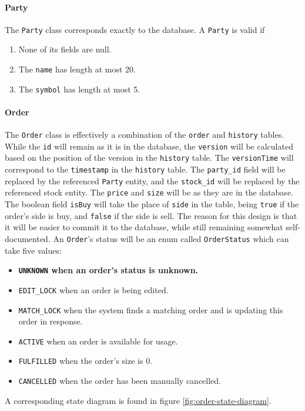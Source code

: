 \documentclass{article}
\begin{document}
 
\paragraph{Party} The \texttt{Party} class corresponds exactly to the database. A \texttt{Party} is valid if 
\begin{enumerate}
    \item None of its fields are null.
    \item The \texttt{name} has length at most 20.
    \item The \texttt{symbol} has length at most 5.
\end{enumerate}


\paragraph{Order} The \texttt{Order} class is effectively a combination of the \texttt{order} and \texttt{history} tables. While the \texttt{id} will remain as it is in the database, the \texttt{version} will be calculated based on the position of the version in the \texttt{history} table. The \texttt{versionTime} will correspond to the \texttt{timestamp} in the \texttt{history} table. The \texttt{party\_id} field will be replaced by the referenced \texttt{Party} entity, and the \texttt{stock\_id} will be replaced by the referenced stock entity. The \texttt{price} and \texttt{size} will be as they are in the database. The boolean field \texttt{isBuy} will take the place of \texttt{side} in the table, being \texttt{true} if the order's side is buy, and \texttt{false} if the side is sell. The reason for this design is that it will be easier to commit it to the database, while still remaining somewhat self-documented. An \texttt{Order}'s status will be an enum called \texttt{OrderStatus} which can take five values:

\begin{itemize}
    \item \textbf{\texttt{UNKNOWN} when an order's status is unknown.}
    \item \texttt{EDIT\_LOCK} when an order is being edited.
    \item \texttt{MATCH\_LOCK} when the system finds a matching order and is updating this order in response.
    \item \texttt{ACTIVE} when an order is available for usage.
    \item \texttt{FULFILLED} when the order's size is 0.
    \item \texttt{CANCELLED} when the order has been manually cancelled.
\end{itemize} 
A corresponding state diagram is found in figure \ref{fig:order-state-diagram}.
\end{document}
